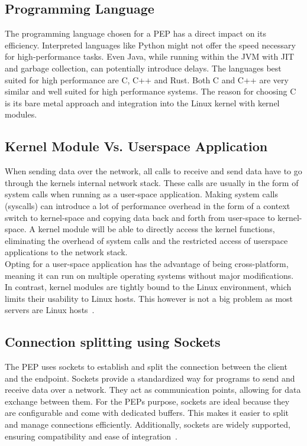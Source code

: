 \documentclass[a4paper,english, 11pt]{report}
\begin{document}
\subsection{Programming Language}
The programming language chosen for a PEP has a direct impact on its efficiency. Interpreted languages like Python might not offer the speed necessary for high-performance tasks. Even Java, while running within the JVM with JIT and garbage collection, can potentially introduce delays. The languages best suited for high performance are C, C++ and Rust. Both C and C++ are very similar and well suited for high performance systems. The reason for choosing C is its bare metal approach and integration into the Linux kernel with kernel modules.

\subsection{Kernel Module Vs. Userspace Application}
When sending data over the network, all calls to receive and send data have to go through the kernels internal network stack. These calls are usually in the form of system calls when running as a user-space application. Making system calls (syscalls) can introduce a lot of performance overhead in the form of a context switch to kernel-space and copying data back and forth from user-space to kernel-space. A kernel module will be able to directly access the kernel functions, eliminating the overhead of system calls and the restricted access of userspace applications to the network stack.\\

Opting for a user-space application has the advantage of being cross-platform, meaning it can run on multiple operating systems without major modifications. In contrast, kernel modules are tightly bound to the Linux environment, which limits their usability to Linux hosts. This however is not a big problem as most servers are Linux hosts~\cite{w3techs_operating_system_statistics}.

\subsection{Connection splitting using Sockets}%
The PEP uses sockets to establish and split the connection between the client and the endpoint. Sockets provide a standardized way for programs to send and receive data over a network. They act as communication points, allowing for data exchange between them. For the PEPs purpose, sockets are ideal because they are configurable and come with dedicated buffers. This makes it easier to split and manage connections efficiently. Additionally, sockets are widely supported, ensuring compatibility and ease of integration~\cite{8999401}.\\
\end{document}
